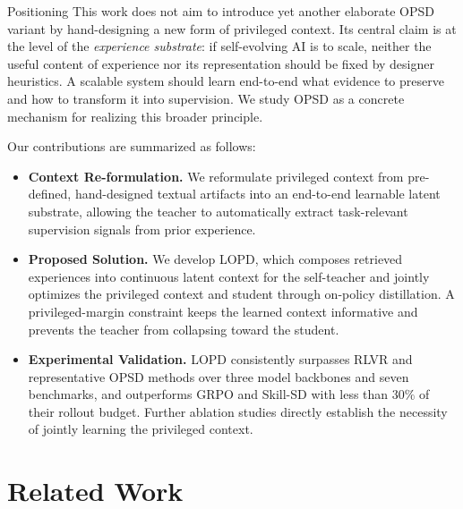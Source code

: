 \documentclass{article} %
\newcommand{\ourmethod}{{\textsc{LOPD}}\xspace}
\begin{document}
\begin{insightbox}{Positioning}
This work does not aim to introduce yet another elaborate OPSD variant by hand-designing a new form of privileged context. Its central claim is at the level of the \emph{experience substrate}: if self-evolving AI is to scale, neither the useful content of experience nor its representation should be fixed by designer heuristics. A scalable system should learn end-to-end what evidence to preserve and how to transform it into supervision. We study OPSD as a concrete mechanism for realizing this broader principle.
\end{insightbox}



Our contributions are summarized as follows:
\vspace{-0.5em}
\begin{itemize}[leftmargin=*, itemsep=0pt, parsep=0pt]
    \item \textbf{Context Re-formulation.}
    We reformulate privileged context from pre-defined, hand-designed textual artifacts into an end-to-end learnable latent substrate, allowing the teacher to automatically extract task-relevant supervision signals from prior experience.
    \item \textbf{Proposed Solution.}
    We develop \ourmethod, which composes retrieved experiences into continuous latent context for the self-teacher and jointly optimizes the privileged context and student through on-policy distillation. A privileged-margin constraint keeps the learned context informative and prevents the teacher from collapsing toward the student.
    \item \textbf{Experimental Validation.}   \ourmethod consistently surpasses RLVR and representative OPSD methods over three model backbones and seven benchmarks, and outperforms GRPO and Skill-SD with less than $30\%$ of their rollout budget. Further ablation studies directly establish the necessity of jointly learning the privileged context.

\end{itemize}



\vspace{-0.4em}
\section{Related Work}

\vspace{-0.6em}
\end{document}
